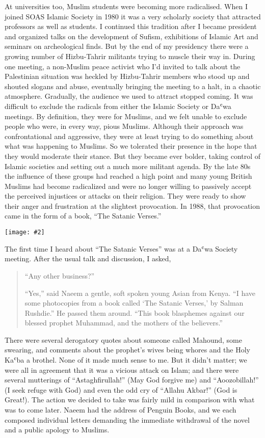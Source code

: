 \documentclass[12pt]{memoir}
\def\`{ʿ} %
\newcommand{\img}[3]{\begin{center}%
\texttt{[image: \#2]}\\{\small\em#3}%
\end{center}}
\begin{document}
At universities too, Muslim students were becoming more radicalised.
When I joined SOAS Islamic Society in 1980 it was a very scholarly society
that attracted professors as well as students.
I continued this tradition after I became president
and organized talks on the development of Sufism,
exhibitions of Islamic Art and seminars on archeological finds.
But by the end of my presidency there were a growing number
of Hizbu-Tahrir militants trying to muscle their way in.
During one meeting, a non-Muslim peace activist
who I’d invited to talk about the Palestinian situation was heckled
by Hizbu-Tahrir members who stood up and shouted slogans and abuse,
eventually bringing the meeting to a halt, in a chaotic atmosphere.
Gradually, the audience we used to attract stopped coming.
It was difficult to exclude the radicals
from either the Islamic Society or Da\`wa meetings.
By definition, they were for Muslims,
and we felt unable to exclude people who were, in every way, pious Muslims.
Although their approach was confrontational and aggressive,
they were at least trying to do something about what was happening to Muslims.
So we tolerated their presence in the hope
that they would moderate their stance.
But they became ever bolder,
taking control of Islamic societies
and setting out a much more militant agenda.
By the late 80s the influence of these groups had reached a high point
and many young British Muslims had become radicalized
and were no longer willing to passively accept
the perceived injustices or attacks on their religion.
They were ready to show their anger
and frustration at the slightest provocation.
In 1988, that provocation came in the form of a book, “The Satanic Verses.”

\img{scale=1}{Satanic_Verses_Demo.jpg}{}

The first time I heard about “The Satanic Verses”
was at a Da\`wa Society meeting.
After the usual talk and discussion, I asked,

\begin{quote}
“Any other business?”

“Yes,” said Naeem a gentle, soft spoken young Asian from Kenya.
“I have some photocopies from a book called ‘The Satanic Verses,’
by Salman Rushdie.”
He passed them around.
“This book blasphemes against our blessed prophet Muhammad,
and the mothers of the believers.”
\end{quote}

There were several derogatory quotes about someone called Mahound,
some swearing, and comments about the prophet’s wives
being whores and the Holy Ka\`ba a brothel.
None of it made much sense to me.
But it didn’t matter;
we were all in agreement that it was a vicious attack on Islam;
and there were several mutterings of “Astaghfirullah!”
(May God forgive me) and “Aoozobillah!” (I seek refuge with God)
and even the odd cry of “Allahu Akbar!” (God is Great!).
The action we decided to take was fairly mild
in comparison with what was to come later.
Naeem had the address of Penguin Books,
and we each composed individual letters demanding the immediate withdrawal
of the novel and a public apology to Muslims.
\end{document}
